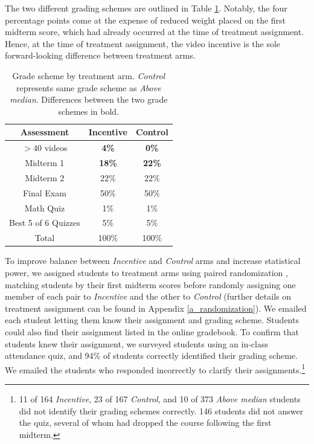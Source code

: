 \documentclass[12pt]{article}
\begin{document}
The two different grading schemes are outlined in Table \ref{gradescheme}. Notably, the four percentage points come at the expense of reduced weight placed on the first midterm score, which had already occurred at the time of treatment assignment. Hence, at the time of treatment assignment, the video incentive is the sole forward-looking difference between treatment arms.

\begin{table}
	\caption{Grade scheme by treatment arm. \textit{Control} represents same grade scheme as \textit{Above median}. Differences between the two grade schemes in bold.}
	\centering
	\begin{tabular}{ c|c|c }
		Assessment & Incentive & Control \\
		\hline
		$>$40 videos & \textbf{4\%} & \textbf{0\%} \\
		Midterm 1 & \textbf{18\%} & \textbf{22\%} \\
		Midterm 2 & 22\% & 22\% \\
		Final Exam & 50\% & 50\% \\
		Math Quiz & 1\% & 1\% \\
		Best 5 of 6 Quizzes & 5\% & 5\% \\
		\hline
		Total & 100\% & 100\% \\
	\end{tabular}
	\label{gradescheme}
\end{table}

To improve balance between \textit{Incentive} and \textit{Control} arms and increase statistical power, we assigned students to treatment arms using paired randomization \parencite{ai2017}, matching students by their first midterm scores before randomly assigning one member of each pair to \textit{Incentive} and the other to \textit{Control} (further details on treatment assignment can be found in Appendix \ref{a_randomization}). We emailed each student letting them know their assignment and grading scheme. Students could also find their assignment listed in the online gradebook. To confirm that students knew their assignment, we surveyed students using an in-class attendance quiz, and 94\% of students correctly identified their grading scheme. We emailed the students who responded incorrectly to clarify their assignments.\footnote{11 of 164 \textit{Incentive}, 23 of 167 \textit{Control}, and 10 of 373 \textit{Above median} students did not identify their grading schemes correctly. 146 students did not answer the quiz, several of whom had dropped the course following the first midterm.}
\end{document}

